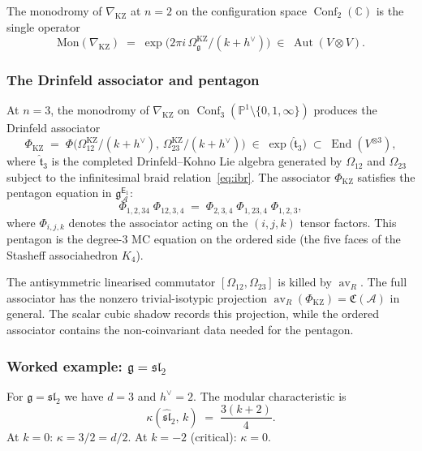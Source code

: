 \documentclass[11pt,reqno]{amsart}
\theoremstyle{definition}
\theoremstyle{remark}
\newcommand{\cA}{\mathcal{A}}
\newcommand{\Eone}{\mathsf{E}_{1}}
\DeclareMathOperator{\Aut}{Aut}
\DeclareMathOperator{\End}{End}
\DeclareMathOperator{\Conf}{Conf}
\DeclareMathOperator{\av}{av}
\newcommand{\fg}{\mathfrak{g}}
\newcommand{\gEone}{\mathfrak{g}^{\Eone}_{\cA}}
\newcommand{\CC}{\mathbb{C}}
\newcommand{\PP}{\mathbb{P}}
\numberwithin{equation}{section}
\begin{document}
The monodromy of $\nabla_{\mathrm{KZ}}$ at $n = 2$ on the
configuration space $\Conf_2(\CC)$ is the single operator
\begin{equation}\label{eq:kz-monodromy-n2}
  \mathrm{Mon}(\nabla_{\mathrm{KZ}})
  \;=\;
  \exp\!\bigl(2\pi i\,\Omega^{\mathrm{KZ}}_\fg/(k+h^\vee)\bigr)
  \;\in\; \Aut(V \otimes V).
\end{equation}

\subsubsection{The Drinfeld associator and pentagon}

At $n = 3$, the monodromy of $\nabla_{\mathrm{KZ}}$ on
$\Conf_3(\PP^1 \setminus \{0,1,\infty\})$ produces the
Drinfeld associator
\begin{equation}\label{eq:drinfeld-associator}
  \Phi_{\mathrm{KZ}}
  \;=\;
  \Phi\!\bigl(\Omega^{\mathrm{KZ}}_{12}/(k+h^\vee),\,
  \Omega^{\mathrm{KZ}}_{23}/(k+h^\vee)\bigr)
  \;\in\; \exp\bigl(\hat{\mathfrak{t}}_3\bigr)
  \;\subset\; \End(V^{\otimes 3}),
\end{equation}
where $\hat{\mathfrak{t}}_3$ is the completed Drinfeld--Kohno Lie
algebra generated by $\Omega_{12}$ and $\Omega_{23}$ subject to
the infinitesimal braid relation~\eqref{eq:ibr}. The associator
$\Phi_{\mathrm{KZ}}$ satisfies the pentagon equation in $\gEone$:
\begin{equation}\label{eq:pentagon}
  \Phi_{1,2,34}\;
  \Phi_{12,3,4}
  \;=\;
  \Phi_{2,3,4}\;
  \Phi_{1,23,4}\;
  \Phi_{1,2,3},
\end{equation}
where $\Phi_{i,j,k}$ denotes the associator acting on the
$(i,j,k)$ tensor factors. This pentagon is the degree-$3$ MC
equation on the ordered side (the five faces of the Stasheff
associahedron $K_4$).

The antisymmetric linearised commutator
$[\Omega_{12}, \Omega_{23}]$ is killed by $\av_R$. The full
associator has the nonzero trivial-isotypic projection
\(\av_R(\Phi_{\mathrm{KZ}})=\mathfrak C(\cA)\) in general. The scalar
cubic shadow records this projection, while the ordered associator
contains the non-coinvariant data needed for the pentagon.

\subsubsection{Worked example: $\fg = \mathfrak{sl}_2$}
\label{subsubsec:sl2-example}

For $\fg = \mathfrak{sl}_2$ we have $d = 3$ and $h^\vee = 2$.
The modular characteristic is
\begin{equation}\label{eq:sl2-kappa}
  \kappa(\widehat{\mathfrak{sl}}_2,\, k)
  \;=\;
  \frac{3(k+2)}{4}.
\end{equation}
At $k = 0$: $\kappa = 3/2 = d/2$. At $k = -2$ (critical):
$\kappa = 0$.
\end{document}
